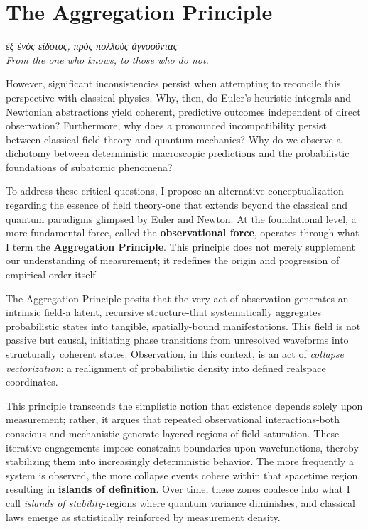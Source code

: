 \chapter{The Aggregation Principle}

\begin{flushright}
\textit{ἐξ ἑνὸς εἰδότος, πρὸς πολλοὺς ἀγνοοῦντας} \\
\textit{From the one who knows, to those who do not.}
\end{flushright}
\vspace{1em}

However, significant inconsistencies persist when attempting to reconcile this perspective with classical physics. Why, then, do Euler's heuristic integrals and Newtonian abstractions yield coherent, predictive outcomes independent of direct observation? Furthermore, why does a pronounced incompatibility persist between classical field theory and quantum mechanics? Why do we observe a dichotomy between deterministic macroscopic predictions and the probabilistic foundations of subatomic phenomena?

To address these critical questions, I propose an alternative conceptualization regarding the essence of field theory-one that extends beyond the classical and quantum paradigms glimpsed by Euler and Newton. At the foundational level, a more fundamental force, called the \textbf{observational force}, operates through what I term the \textbf{Aggregation Principle}. This principle does not merely supplement our understanding of measurement; it redefines the origin and progression of empirical order itself.

The Aggregation Principle posits that the very act of observation generates an intrinsic field-a latent, recursive structure-that systematically aggregates probabilistic states into tangible, spatially-bound manifestations. This field is not passive but causal, initiating phase transitions from unresolved waveforms into structurally coherent states. Observation, in this context, is an act of \textit{collapse vectorization}: a realignment of probabilistic density into defined realspace coordinates.

This principle transcends the simplistic notion that existence depends solely upon measurement; rather, it argues that repeated observational interactions-both conscious and mechanistic-generate layered regions of field saturation. These iterative engagements impose constraint boundaries upon wavefunctions, thereby stabilizing them into increasingly deterministic behavior. The more frequently a system is observed, the more collapse events cohere within that spacetime region, resulting in \textbf{islands of definition}. Over time, these zones coalesce into what I call \textit{islands of stability}-regions where quantum variance diminishes, and classical laws emerge as statistically reinforced by measurement density.

